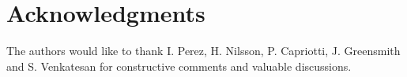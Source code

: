 \section*{Acknowledgments}
The authors would like to thank I. Perez, H. Nilsson, P. Capriotti, J. Greensmith and S. Venkatesan for constructive comments and valuable discussions.
